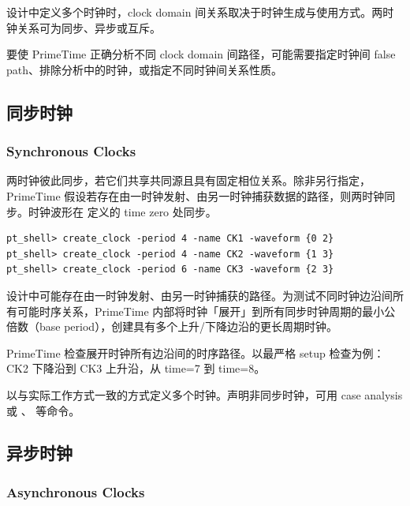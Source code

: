 设计中定义多个时钟时，clock domain 间关系取决于时钟生成与使用方式。两时钟关系可为同步、异步或互斥。


要使 PrimeTime 正确分析不同 clock domain 间路径，可能需要指定时钟间 false path、排除分析中的时钟，或指定不同时钟间关系性质。

\subsection{同步时钟}
\subsubsection*{Synchronous Clocks}

两时钟彼此同步，若它们共享共同源且具有固定相位关系。除非另行指定，PrimeTime 假设若存在由一时钟发射、由另一时钟捕获数据的路径，则两时钟同步。时钟波形在  定义的 time zero 处同步。

\begin{lstlisting}
pt_shell> create_clock -period 4 -name CK1 -waveform {0 2}
pt_shell> create_clock -period 4 -name CK2 -waveform {1 3}
pt_shell> create_clock -period 6 -name CK3 -waveform {2 3}
\end{lstlisting}


设计中可能存在由一时钟发射、由另一时钟捕获的路径。为测试不同时钟边沿间所有可能时序关系，PrimeTime 内部将时钟「展开」到所有同步时钟周期的最小公倍数（base period），创建具有多个上升/下降边沿的更长周期时钟。


PrimeTime 检查展开时钟所有边沿间的时序路径。以最严格 setup 检查为例：CK2 下降沿到 CK3 上升沿，从 time=7 到 time=8。

以与实际工作方式一致的方式定义多个时钟。声明非同步时钟，可用 case analysis 或 、 等命令。

\subsection{异步时钟}
\subsubsection*{Asynchronous Clocks}

